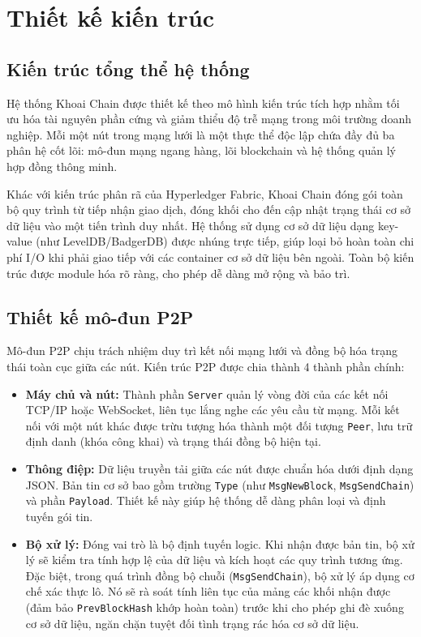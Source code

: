 \documentclass[12pt,a4paper]{article}
\begin{document}
\section{Thiết kế kiến trúc}

\subsection{Kiến trúc tổng thể hệ thống}
Hệ thống Khoai Chain được thiết kế theo mô hình kiến trúc tích hợp nhằm tối ưu hóa tài nguyên phần cứng và giảm thiểu độ trễ mạng trong môi trường doanh nghiệp. Mỗi một nút trong mạng lưới là một thực thể độc lập chứa đầy đủ ba phân hệ cốt lõi: mô-đun mạng ngang hàng, lõi blockchain và hệ thống quản lý hợp đồng thông minh.

Khác với kiến trúc phân rã của Hyperledger Fabric, Khoai Chain đóng gói toàn bộ quy trình từ tiếp nhận giao dịch, đóng khối cho đến cập nhật trạng thái cơ sở dữ liệu vào một tiến trình duy nhất. Hệ thống sử dụng cơ sở dữ liệu dạng key-value (như LevelDB/BadgerDB) được nhúng trực tiếp, giúp loại bỏ hoàn toàn chi phí I/O khi phải giao tiếp với các container cơ sở dữ liệu bên ngoài. Toàn bộ kiến trúc được module hóa rõ ràng, cho phép dễ dàng mở rộng và bảo trì.

\subsection{Thiết kế mô-đun P2P}
Mô-đun P2P chịu trách nhiệm duy trì kết nối mạng lưới và đồng bộ hóa trạng thái toàn cục giữa các nút. Kiến trúc P2P được chia thành 4 thành phần chính:
\begin{itemize}
    \item \textbf{Máy chủ và nút:} Thành phần \texttt{Server} quản lý vòng đời của các kết nối TCP/IP hoặc WebSocket, liên tục lắng nghe các yêu cầu từ mạng. Mỗi kết nối với một nút khác được trừu tượng hóa thành một đối tượng \texttt{Peer}, lưu trữ định danh (khóa công khai) và trạng thái đồng bộ hiện tại.
    \item \textbf{Thông điệp:} Dữ liệu truyền tải giữa các nút được chuẩn hóa dưới định dạng JSON. Bản tin cơ sở bao gồm trường \texttt{Type} (như \texttt{MsgNewBlock}, \texttt{MsgSendChain}) và phần \texttt{Payload}. Thiết kế này giúp hệ thống dễ dàng phân loại và định tuyến gói tin.
    \item \textbf{Bộ xử lý:} Đóng vai trò là bộ định tuyến logic. Khi nhận được bản tin, bộ xử lý sẽ kiểm tra tính hợp lệ của dữ liệu và kích hoạt các quy trình tương ứng. Đặc biệt, trong quá trình đồng bộ chuỗi (\texttt{MsgSendChain}), bộ xử lý áp dụng cơ chế xác thực lô. Nó sẽ rà soát tính liên tục của mảng các khối nhận được (đảm bảo \texttt{PrevBlockHash} khớp hoàn toàn) trước khi cho phép ghi đè xuống cơ sở dữ liệu, ngăn chặn tuyệt đối tình trạng rác hóa cơ sở dữ liệu.
\end{itemize}
\newpage
\end{document}
